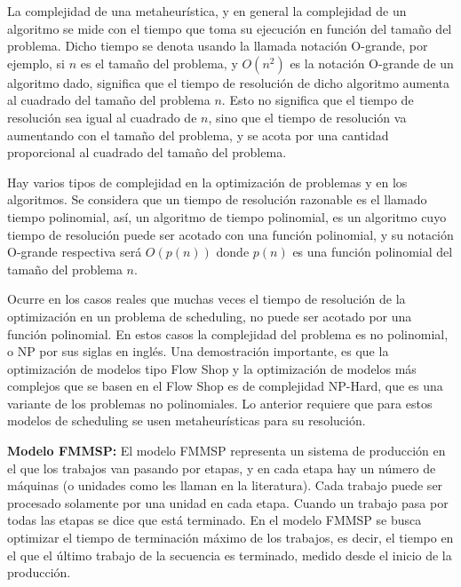 \documentclass{article}
\begin{document}
\vspace{\baselineskip}
La complejidad de una metaheurística, y en general la complejidad de un
algoritmo se mide con el tiempo que toma su ejecución en función del tamaño
del problema. Dicho tiempo se denota usando la llamada notación O-grande,
por ejemplo, si $n$ es el tamaño del problema, y $O(n^2)$ es la notación
O-grande de un algoritmo dado, significa que el tiempo de resolución de
dicho algoritmo aumenta al cuadrado del tamaño del problema $n$. Esto no
significa que el tiempo de resolución sea igual al cuadrado de $n$, sino
que el tiempo de resolución va aumentando con el tamaño del problema, y
se acota por una cantidad proporcional al cuadrado del tamaño del problema.
\autocite{metaTalbi}

\vspace{\baselineskip}
Hay varios tipos de complejidad en la optimización de problemas y en los
algoritmos. Se considera que un tiempo de resolución razonable es el llamado
tiempo polinomial, así, un algoritmo de tiempo polinomial, es un algoritmo
cuyo tiempo de resolución puede ser acotado con una función polinomial, y
su notación O-grande respectiva será $O(p(n))$ donde $p(n)$ es una función
polinomial del tamaño del problema $n$. \autocite{metaTalbi}

\vspace{\baselineskip}
Ocurre en los casos reales que muchas veces el tiempo de resolución de la 
optimización en un problema de scheduling, no puede ser acotado por una
función polinomial. En estos casos la complejidad del problema es no
polinomial, o NP por sus siglas en inglés. Una demostración importante, es
que la optimización de modelos tipo Flow Shop y la optimización de modelos 
más complejos
que se basen en el Flow Shop es de complejidad NP-Hard, que es una variante
de los problemas no polinomiales. Lo anterior requiere que para estos 
modelos de scheduling se usen
metaheurísticas para su resolución. \autocite{flowCompl}

\vspace{\baselineskip}
\textbf{Modelo FMMSP:} El modelo FMMSP representa un sistema de producción
en el que los trabajos van pasando por etapas, y en cada etapa hay un
número de máquinas (o unidades como les llaman en la literatura). Cada
trabajo puede ser procesado solamente por una unidad en cada etapa. Cuando
un trabajo pasa por todas las etapas se dice que está terminado. En el
modelo FMMSP se busca optimizar el tiempo de terminación máximo de los
trabajos, es decir, el tiempo en el que el último trabajo de la secuencia
es terminado, medido desde el inicio de la producción. \autocite{modFMMSP}
\end{document}
